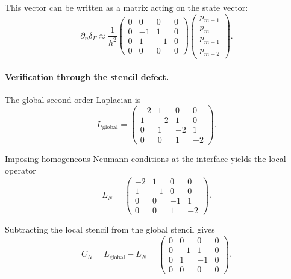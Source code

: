 \documentclass[a4paper,11pt]{article}
\begin{document}
This vector can be written as a matrix acting on the state vector:
\begin{equation}
[p]\partial_n\delta_\Gamma
\approx
\frac1{h^2}
\begin{pmatrix}
0 & 0 & 0 & 0\\
0 & -1 & 1 & 0\\
0 & 1 & -1 & 0\\
0 & 0 & 0 & 0
\end{pmatrix}
\begin{pmatrix}
p_{m-1}\\
p_m\\
p_{m+1}\\
p_{m+2}
\end{pmatrix}.
\label{eq:discrete-neumann-matrix}
\end{equation}

\paragraph{Verification through the stencil defect.}

The global second-order Laplacian is
\begin{equation}
L_{\mathrm{global}}
=
\begin{pmatrix}
-2 & 1 & 0 & 0\\
1 & -2 & 1 & 0\\
0 & 1 & -2 & 1\\
0 & 0 & 1 & -2
\end{pmatrix}.
\end{equation}

Imposing homogeneous Neumann conditions at the interface yields the local
operator
\begin{equation}
L_N
=
\begin{pmatrix}
-2 & 1 & 0 & 0\\
1 & -1 & 0 & 0\\
0 & 0 & -1 & 1\\
0 & 0 & 1 & -2
\end{pmatrix}.
\end{equation}

Subtracting the local stencil from the global stencil gives
\begin{equation}
C_N
=
L_{\mathrm{global}}
-
L_N
=
\begin{pmatrix}
0 & 0 & 0 & 0\\
0 & -1 & 1 & 0\\
0 & 1 & -1 & 0\\
0 & 0 & 0 & 0
\end{pmatrix}.
\end{equation}
\end{document}
